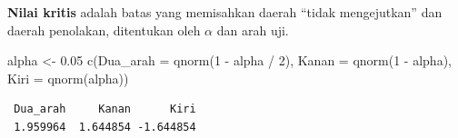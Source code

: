 \documentclass[
  indonesian,
  letterpaper,
]{book}
\newenvironment{Shaded}{\begin{snugshade}}{\end{snugshade}}
\newcommand{\AttributeTok}[1]{\textcolor[rgb]{0.40,0.45,0.13}{#1}}
\newcommand{\DecValTok}[1]{\textcolor[rgb]{0.68,0.00,0.00}{#1}}
\newcommand{\FloatTok}[1]{\textcolor[rgb]{0.68,0.00,0.00}{#1}}
\newcommand{\FunctionTok}[1]{\textcolor[rgb]{0.28,0.35,0.67}{#1}}
\newcommand{\NormalTok}[1]{\textcolor[rgb]{0.00,0.23,0.31}{#1}}
\newcommand{\OtherTok}[1]{\textcolor[rgb]{0.00,0.23,0.31}{#1}}
\newcommand{\SpecialCharTok}[1]{\textcolor[rgb]{0.37,0.37,0.37}{#1}}
\begin{document}
\textbf{Nilai kritis} adalah batas yang memisahkan daerah ``tidak
mengejutkan'' dan daerah penolakan, ditentukan oleh \(\alpha\) dan arah
uji.

\begin{Shaded}
\begin{Highlighting}[]
\NormalTok{alpha }\OtherTok{\textless{}{-}} \FloatTok{0.05}
\FunctionTok{c}\NormalTok{(}\AttributeTok{Dua\_arah =} \FunctionTok{qnorm}\NormalTok{(}\DecValTok{1} \SpecialCharTok{{-}}\NormalTok{ alpha }\SpecialCharTok{/} \DecValTok{2}\NormalTok{), }\AttributeTok{Kanan =} \FunctionTok{qnorm}\NormalTok{(}\DecValTok{1} \SpecialCharTok{{-}}\NormalTok{ alpha), }\AttributeTok{Kiri =} \FunctionTok{qnorm}\NormalTok{(alpha))}
\end{Highlighting}
\end{Shaded}

\begin{verbatim}
 Dua_arah     Kanan      Kiri 
 1.959964  1.644854 -1.644854 
\end{verbatim}
\end{document}
